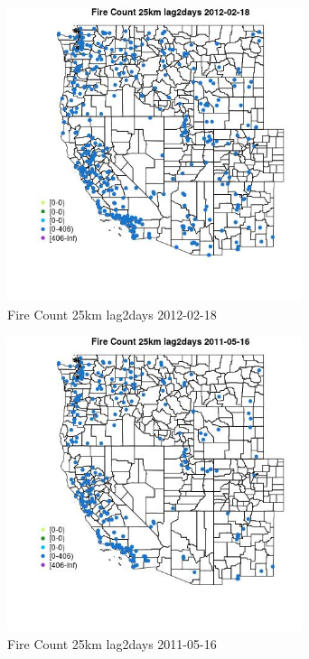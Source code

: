 \begin{figure} 
\centering  
\includegraphics[width=0.77\textwidth]{Code_Outputs/Report_ML_input_PM25_Step4_part_f_de_duplicated_aveswNAs_MapObsFire_Count_25km_lag2days2012-02-18.jpg} 
\caption{\label{fig:Report_ML_input_PM25_Step4_part_f_de_duplicated_aveswNAsMapObsFire_Count_25km_lag2days2012-02-18}Fire Count 25km lag2days 2012-02-18} 
\end{figure} 
 

\begin{figure} 
\centering  
\includegraphics[width=0.77\textwidth]{Code_Outputs/Report_ML_input_PM25_Step4_part_f_de_duplicated_aveswNAs_MapObsFire_Count_25km_lag2days2011-05-16.jpg} 
\caption{\label{fig:Report_ML_input_PM25_Step4_part_f_de_duplicated_aveswNAsMapObsFire_Count_25km_lag2days2011-05-16}Fire Count 25km lag2days 2011-05-16} 
\end{figure} 
 

